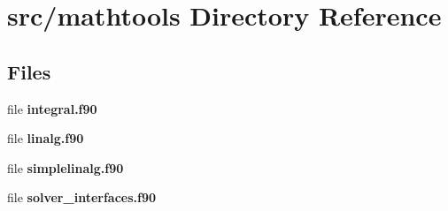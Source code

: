 \section{src/mathtools Directory Reference}
\label{dir_bf675e16ed2035949598287754f13f6b}
\subsection*{Files}
\begin{DoxyCompactItemize}
\item 
file {\bf integral.\+f90}
\item 
file {\bf linalg.\+f90}
\item 
file {\bf simplelinalg.\+f90}
\item 
file {\bf solver\+\_\+interfaces.\+f90}
\end{DoxyCompactItemize}
